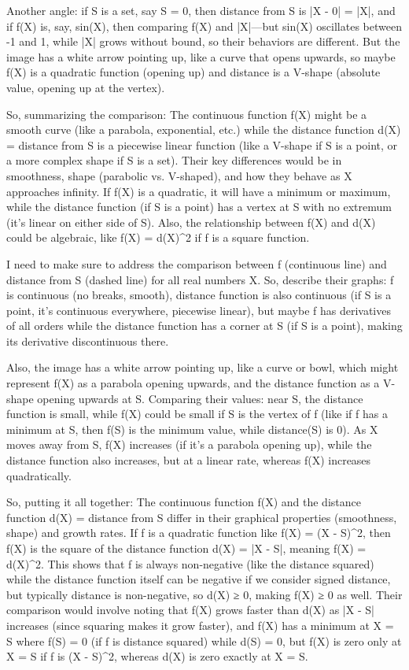 Another angle: if S is a set, say S = {0}, then distance from S is |X - 0| = |X|, and if f(X) is, say, sin(X), then comparing f(X) and |X|—but sin(X) oscillates between -1 and 1, while |X| grows without bound, so their behaviors are different. But the image has a white arrow pointing up, like a curve that opens upwards, so maybe f(X) is a quadratic function (opening up) and distance is a V-shape (absolute value, opening up at the vertex). 

So, summarizing the comparison: The continuous function f(X) might be a smooth curve (like a parabola, exponential, etc.) while the distance function d(X) = distance from S is a piecewise linear function (like a V-shape if S is a point, or a more complex shape if S is a set). Their key differences would be in smoothness, shape (parabolic vs. V-shaped), and how they behave as X approaches infinity. If f(X) is a quadratic, it will have a minimum or maximum, while the distance function (if S is a point) has a vertex at S with no extremum (it's linear on either side of S). Also, the relationship between f(X) and d(X) could be algebraic, like f(X) = d(X)^2 if f is a square function. 

I need to make sure to address the comparison between f (continuous line) and distance from S (dashed line) for all real numbers X. So, describe their graphs: f is continuous (no breaks, smooth), distance function is also continuous (if S is a point, it's continuous everywhere, piecewise linear), but maybe f has derivatives of all orders while the distance function has a corner at S (if S is a point), making its derivative discontinuous there. 

Also, the image has a white arrow pointing up, like a curve or bowl, which might represent f(X) as a parabola opening upwards, and the distance function as a V-shape opening upwards at S. Comparing their values: near S, the distance function is small, while f(X) could be small if S is the vertex of f (like if f has a minimum at S, then f(S) is the minimum value, while distance(S) is 0). As X moves away from S, f(X) increases (if it's a parabola opening up), while the distance function also increases, but at a linear rate, whereas f(X) increases quadratically. 

So, putting it all together: The continuous function f(X) and the distance function d(X) = distance from S differ in their graphical properties (smoothness, shape) and growth rates. If f is a quadratic function like f(X) = (X - S)^2, then f(X) is the square of the distance function d(X) = |X - S|, meaning f(X) = d(X)^2. This shows that f is always non-negative (like the distance squared) while the distance function itself can be negative if we consider signed distance, but typically distance is non-negative, so d(X) ≥ 0, making f(X) ≥ 0 as well. Their comparison would involve noting that f(X) grows faster than d(X) as |X - S| increases (since squaring makes it grow faster), and f(X) has a minimum at X = S where f(S) = 0 (if f is distance squared) while d(S) = 0, but f(X) is zero only at X = S if f is (X - S)^2, whereas d(X) is zero exactly at X = S. 

